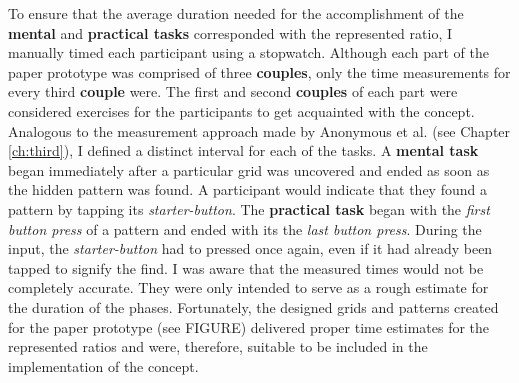 To ensure that the average duration needed for the accomplishment of the \textbf{mental} and \textbf{practical tasks} corresponded with the represented ratio, I manually timed each participant using a stopwatch. Although each part of the paper prototype was comprised of three \textbf{couples}, only the time measurements for every third \textbf{couple} were. The first and second \textbf{couples} of each part were considered exercises for the participants to get acquainted with the concept. \\
Analogous to the measurement approach made by Anonymous et al. \cite{anonymous} (see Chapter \ref{ch:third}), I defined a distinct interval for each of the tasks. A \textbf{mental task} began immediately after a particular grid was uncovered and ended as soon as the hidden pattern was found. A participant would indicate that they found a pattern by tapping its \textit{starter-button}. The \textbf{practical task} began with the \textit{first button press} of a pattern and ended with its the \textit{last button press}. During the input, the \textit{starter-button} had to pressed once again, even if it had already been tapped to signify the find. I was aware that the measured times would not be completely accurate. They were only intended to serve as a rough estimate for the duration of the phases. Fortunately, the designed grids and patterns created for the paper prototype (see FIGURE) delivered proper time estimates for the represented ratios and were, therefore, suitable to be included in the implementation of the concept.\\

